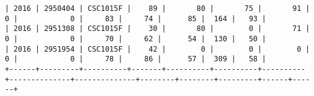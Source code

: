 \begin{sidewaysfigure}
\begin{mdframed}[rightline=false,leftline=false,topline=false]
\begin{BVerbatim}
| 2016 | 2950404 | CSC1015F |    89 |       80 |       75 |       91 |            0 |            0 |     83 |     74 |      85 |  164 |   93 |
| 2016 | 2951308 | CSC1015F |    30 |       80 |        0 |       71 |            0 |            0 |     70 |     62 |      54 |  130 |   50 |
| 2016 | 2951954 | CSC1015F |    42 |        0 |        0 |        0 |            0 |            0 |     78 |     86 |      57 |  309 |   58 |
+------+---------+----------+-------+----------+----------+----------+--------------+--------------+--------+--------+---------+------+------+
        \end{BVerbatim}
    \end{mdframed}
    \caption[Sample of 3-way CSV output]{\textbf{Figure \ref{fig-3-way-csv-output}: Sample of the 3-way join output CSV.} List function output is a CSV download with the schema as represented in this figure. The full CSV has 586 rows (including a header row). Since only a single year of data was analyzed, there are no repeated StudentIDs in the dataset.}
    \label{fig-3-way-csv-output}
\end{sidewaysfigure}
